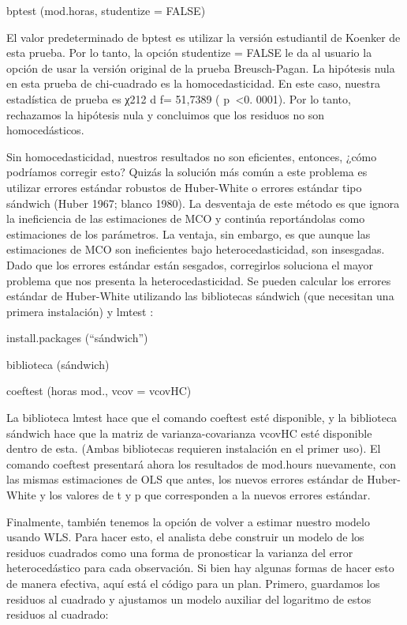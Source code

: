 \documentclass[
]{book}
\begin{document}
bptest (mod.horas, studentize = FALSE)

El valor predeterminado de bptest es utilizar la versión estudiantil de Koenker de esta prueba. Por lo tanto, la opción studentize = FALSE le da al usuario la opción de usar la versión original de la prueba Breusch-Pagan. La hipótesis nula en esta prueba de chi-cuadrado es la homocedasticidad. En este caso, nuestra estadística de prueba es χ212 d f= 51,7389 ( p  \textless0. 0001). Por lo tanto, rechazamos la hipótesis nula y concluimos que los residuos no son homocedásticos.

Sin homocedasticidad, nuestros resultados no son eficientes, entonces, ¿cómo podríamos corregir esto? Quizás la solución más común a este problema es utilizar errores estándar robustos de Huber-White o errores estándar tipo sándwich (Huber 1967; blanco 1980). La desventaja de este método es que ignora la ineficiencia de las estimaciones de MCO y continúa reportándolas como estimaciones de los parámetros. La ventaja, sin embargo, es que aunque las estimaciones de MCO son ineficientes bajo heterocedasticidad, son insesgadas. Dado que los errores estándar están sesgados, corregirlos soluciona el mayor problema que nos presenta la heterocedasticidad. Se pueden calcular los errores estándar de Huber-White utilizando las bibliotecas sándwich (que necesitan una primera instalación) y lmtest :

install.packages (``sándwich'')

biblioteca (sándwich)

coeftest (horas mod., vcov = vcovHC)

La biblioteca lmtest hace que el comando coeftest esté disponible, y la biblioteca sándwich hace que la matriz de varianza-covarianza vcovHC esté disponible dentro de esta. (Ambas bibliotecas requieren instalación en el primer uso). El comando coeftest presentará ahora los resultados de mod.hours nuevamente, con las mismas estimaciones de OLS que antes, los nuevos errores estándar de Huber-White y los valores de t y p que corresponden a la nuevos errores estándar.

Finalmente, también tenemos la opción de volver a estimar nuestro modelo usando WLS. Para hacer esto, el analista debe construir un modelo de los residuos cuadrados como una forma de pronosticar la varianza del error heterocedástico para cada observación. Si bien hay algunas formas de hacer esto de manera efectiva, aquí está el código para un plan. Primero, guardamos los residuos al cuadrado y ajustamos un modelo auxiliar del logaritmo de estos residuos al cuadrado:
\end{document}
